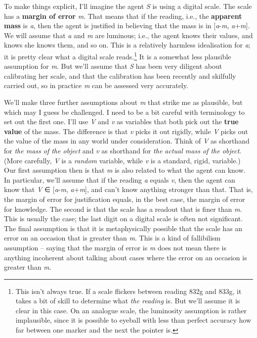 \documentclass[
  10pt,
  letterpaper,
  DIV=11,
  numbers=noendperiod,
  twoside]{scrartcl}
\begin{document}
To make things explicit, I'll imagine the agent \emph{S} is using a
digital scale. The scale has a \textbf{margin of error} \emph{m}. That
means that if the reading, i.e., the \textbf{apparent mass} is \emph{a},
then the agent is justified in believing that the mass is in
{[}\emph{a}-\emph{m}, \emph{a}+\emph{m}{]}. We will assume that \emph{a}
and \emph{m} are luminous; i.e., the agent knows their values, and knows
she knows them, and so on. This is a relatively harmless idealisation
for \emph{a}; it is pretty clear what a digital scale reads.\footnote{This
  isn't always true. If a scale flickers between reading 832g and 833g,
  it takes a bit of skill to determine what \emph{the reading} is. But
  we'll assume it is clear in this case. On an analogue scale, the
  luminosity assumption is rather implausible, since it is possible to
  eyeball with less than perfect accuracy how far between one marker and
  the next the pointer is.} It is a somewhat less plausible assumption
for \emph{m}. But we'll assume that \emph{S} has been very diligent
about calibrating her scale, and that the calibration has been recently
and skilfully carried out, so in practice \emph{m} can be assessed very
accurately.

We'll make three further assumptions about \emph{m} that strike me as
plausible, but which may I guess be challenged. I need to be a bit
careful with terminology to set out the first one. I'll use \emph{V} and
\emph{v} as variables that both pick out the \textbf{true value} of the
mass. The difference is that \emph{v} picks it out rigidly, while
\emph{V} picks out the value of the mass in any world under
consideration. Think of \emph{V} as shorthand for \emph{the mass of the
object} and \emph{v} as shorthand for \emph{the actual mass of the
object}. (More carefully, \emph{V} is a \emph{random} variable, while
\emph{v} is a standard, rigid, variable.) Our first assumption then is
that \emph{m} is also related to what the agent can know. In particular,
we'll assume that if the reading \emph{a} equals \emph{v}, then the
agent can know that \emph{V} ∈ {[}\emph{a}-\emph{m},
\emph{a}+\emph{m}{]}, and can't know anything stronger than that. That
is, the margin of error for justification equals, in the best case, the
margin of error for knowledge. The second is that the scale has a
readout that is finer than \emph{m}. This is usually the case; the last
digit on a digital scale is often not significant. The final assumption
is that it is metaphysically possible that the scale has an error on an
occasion that is greater than \emph{m}. This is a kind of fallibilism
assumption -- saying that the margin of error is \emph{m} does not mean
there is anything incoherent about talking about cases where the error
on an occasion is greater than \emph{m}.
\end{document}
